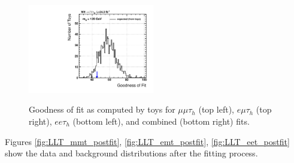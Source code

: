 \begin{figure}
\begin{center}
  \includegraphics[width=0.49\textwidth]{4_Analisys/pics/GoF/vhtt_wh-goodness-of-fit-125.pdf}\\
  \caption{Goodness of fit as computed by toys for $\mu\mu\tau_h$ (top left), $e\mu\tau_h$ (top right), $ee\tau_h$ (bottom left), and combined (bottom right) fits.}
  \label{fig:gof}
\end{center}
\end{figure}


Figures \ref{fig:LLT_mmt_postfit}, \ref{fig:LLT_emt_postfit}, \ref{fig:LLT_eet_postfit} show the data and background distributions after the fitting process.

